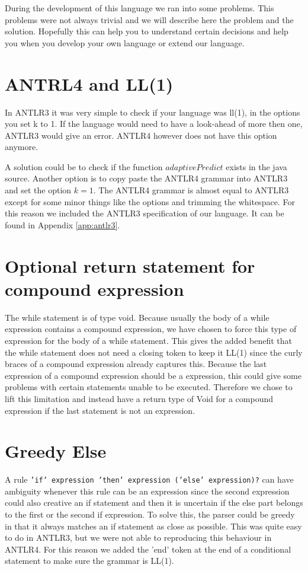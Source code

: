 During the development of this language we ran into some problems. This problems were not always trivial and we will describe here the problem and the solution. Hopefully this can help you to understand certain decisions and help you when you develop your own language or extend our language.
\section{ANTRL4 and LL(1)}
In ANTLR3 it was very simple to check if your language was ll(1), in the options you set k to 1. If the language would need to have a look-ahead of more then one, ANTLR3 would give an error. ANTLR4 however does not have this option anymore.

A solution could be to check if the function $adaptivePredict$ exists in the java source. Another option is to copy paste the ANTLR4 grammar into ANTLR3 and set the option $k=1$. The ANTLR4 grammar is almost equal to ANTLR3 except for some minor things like the options and trimming the whitespace. For this reason we included the ANTLR3 specification of our language. It can be found in Appendix \ref{app:antlr3}.

\section{Optional return statement for compound expression}
The while statement is of type void. Because usually the body of a while expression contains a compound expression, we have chosen to force this type of expression for the body of a while statement. This gives the added benefit that the while statement does not need a closing token to keep it LL(1) since the curly braces of a compound expression already captures this. Because the last expression of a compound expression should be a expression, this could give some problems with certain statements unable to be executed. Therefore we chose to lift this limitation and instead have a return type of Void for a compound expression if the last statement is not an expression.

\section{Greedy Else}
A rule \texttt{'if' expression 'then' expression ('else' expression)?} can have ambiguity whenever this rule can be an expression since the second expression could also creative an if statement and then it is uncertain if the else part belongs to the first or the second if expression. To solve this, the parser could be greedy in that it always matches an if statement as close as possible. This was quite easy to do in ANTLR3, but we were not able to reproducing this behaviour in ANTLR4. For this reason we added the 'end' token at the end of a conditional statement to make sure the grammar is LL(1).

